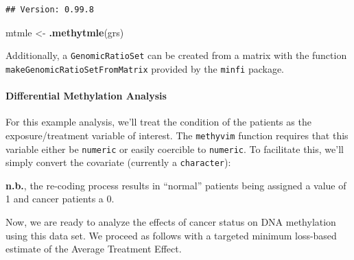\documentclass[9pt,a4paper,]{extarticle}
\newenvironment{Shaded}{\begin{snugshade}}{\end{snugshade}}
\newcommand{\KeywordTok}[1]{\textcolor[rgb]{0.13,0.29,0.53}{\textbf{#1}}}
\newcommand{\DecValTok}[1]{\textcolor[rgb]{0.00,0.00,0.81}{#1}}
\newcommand{\StringTok}[1]{\textcolor[rgb]{0.31,0.60,0.02}{#1}}
\newcommand{\OperatorTok}[1]{\textcolor[rgb]{0.81,0.36,0.00}{\textbf{#1}}}
\newcommand{\NormalTok}[1]{#1}
\theoremstyle{definition}
\theoremstyle{definition}
\theoremstyle{definition}
\theoremstyle{remark}
\begin{document}
\begin{verbatim}
## Version: 0.99.8
\end{verbatim}

\begin{Shaded}
\begin{Highlighting}[]
\NormalTok{mtmle <-}\StringTok{ }\KeywordTok{.methytmle}\NormalTok{(grs)}
\end{Highlighting}
\end{Shaded}

Additionally, a \texttt{GenomicRatioSet} can be created from a matrix
with the function \texttt{makeGenomicRatioSetFromMatrix} provided by the
\texttt{minfi} package.

\paragraph{Differential Methylation
Analysis}\label{differential-methylation-analysis}

For this example analysis, we'll treat the condition of the patients as
the exposure/treatment variable of interest. The \texttt{methyvim}
function requires that this variable either be \texttt{numeric} or
easily coercible to \texttt{numeric}. To facilitate this, we'll simply
convert the covariate (currently a \texttt{character}):

\begin{Shaded}
\end{Shaded}

\textbf{n.b.}, the re-coding process results in ``normal'' patients
being assigned a value of 1 and cancer patients a 0.

Now, we are ready to analyze the effects of cancer status on DNA
methylation using this data set. We proceed as follows with a targeted
minimum loss-based estimate of the Average Treatment Effect.
\end{document}
